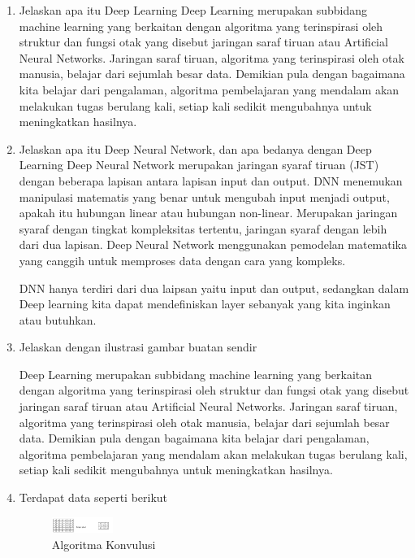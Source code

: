 \begin{enumerate}
        \item Jelaskan apa itu Deep Learning
Deep Learning merupakan subbidang machine learning yang berkaitan dengan algoritma yang terinspirasi oleh struktur dan fungsi otak yang disebut jaringan saraf tiruan atau Artificial Neural Networks. Jaringan saraf tiruan, algoritma yang terinspirasi oleh otak manusia, belajar dari sejumlah besar data. Demikian pula dengan bagaimana kita belajar dari pengalaman, algoritma pembelajaran yang mendalam akan melakukan tugas berulang kali, setiap kali sedikit mengubahnya untuk meningkatkan hasilnya.

        \item Jelaskan apa itu Deep Neural Network, dan apa bedanya dengan Deep Learning
Deep Neural Network merupakan jaringan syaraf tiruan (JST) dengan beberapa lapisan antara lapisan input dan output. DNN menemukan manipulasi matematis yang benar untuk mengubah input menjadi output, apakah itu hubungan linear atau hubungan non-linear. Merupakan jaringan syaraf dengan tingkat kompleksitas tertentu, jaringan syaraf dengan lebih dari dua lapisan. Deep Neural Network menggunakan pemodelan matematika yang canggih untuk memproses data dengan cara yang kompleks.

DNN hanya terdiri dari dua laipsan yaitu input dan output, sedangkan dalam Deep learning kita dapat mendefiniskan layer sebanyak yang kita inginkan atau butuhkan.

        \item Jelaskan dengan ilustrasi gambar buatan sendir

Deep Learning merupakan subbidang machine learning yang berkaitan dengan algoritma yang terinspirasi oleh struktur dan fungsi otak yang disebut jaringan saraf tiruan atau Artificial Neural Networks. Jaringan saraf tiruan, algoritma yang terinspirasi oleh otak manusia, belajar dari sejumlah besar data. Demikian pula dengan bagaimana kita belajar dari pengalaman, algoritma pembelajaran yang mendalam akan melakukan tugas berulang kali, setiap kali sedikit mengubahnya untuk meningkatkan hasilnya.

	\item Terdapat data seperti berikut 
		\begin{figure}[ht]
			\centering
			\includegraphics[width=2cm]{figures/1174008/7/teori7.PNG}
			\caption{Algoritma Konvulusi}
			\label{Teori}
		\end{figure}
	

\end{enumerate}

